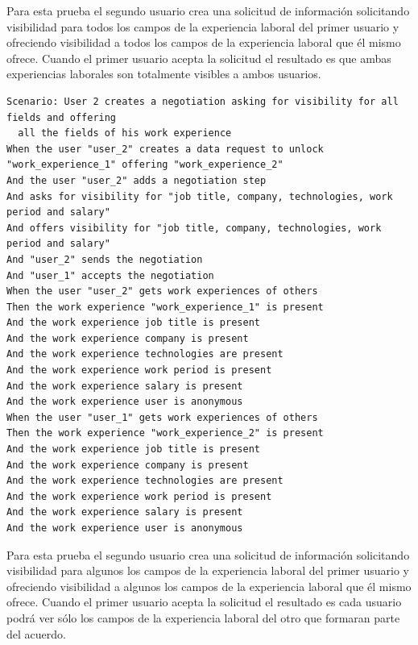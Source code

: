 \documentclass[a4paper, 12pt]{book}
\begin{document}
    Para esta prueba el segundo usuario crea una solicitud de información solicitando visibilidad para todos los campos de
    la experiencia laboral del primer usuario y ofreciendo visibilidad a todos los campos de la experiencia laboral que él mismo
    ofrece. Cuando el primer usuario acepta la solicitud el resultado es que ambas experiencias laborales son totalmente visibles
    a ambos usuarios.
        {\scriptsize
    \linespread{1}
    \begin{verbatim}
Scenario: User 2 creates a negotiation asking for visibility for all fields and offering
  all the fields of his work experience
When the user "user_2" creates a data request to unlock "work_experience_1" offering "work_experience_2"
And the user "user_2" adds a negotiation step
And asks for visibility for "job title, company, technologies, work period and salary"
And offers visibility for "job title, company, technologies, work period and salary"
And "user_2" sends the negotiation
And "user_1" accepts the negotiation
When the user "user_2" gets work experiences of others
Then the work experience "work_experience_1" is present
And the work experience job title is present
And the work experience company is present
And the work experience technologies are present
And the work experience work period is present
And the work experience salary is present
And the work experience user is anonymous
When the user "user_1" gets work experiences of others
Then the work experience "work_experience_2" is present
And the work experience job title is present
And the work experience company is present
And the work experience technologies are present
And the work experience work period is present
And the work experience salary is present
And the work experience user is anonymous
    \end{verbatim}
    }
    Para esta prueba el segundo usuario crea una solicitud de información solicitando visibilidad para algunos los campos de
    la experiencia laboral del primer usuario y ofreciendo visibilidad a algunos los campos de la experiencia laboral que él mismo
    ofrece. Cuando el primer usuario acepta la solicitud el resultado es cada usuario podrá ver sólo los campos de la experiencia
    laboral del otro que formaran parte del acuerdo.
\end{document}
